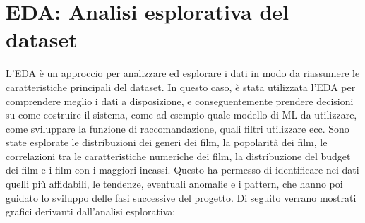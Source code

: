 \documentclass{report}
\begin{document}
    \section{EDA: Analisi esplorativa del dataset}
        L’EDA è un approccio per analizzare ed esplorare i dati in modo da riassumere le caratteristiche principali del dataset.  In questo caso, è stata utilizzata l’EDA per comprendere meglio i dati a disposizione, e conseguentemente prendere decisioni su come costruire il sistema, come ad esempio quale modello di ML da utilizzare, come sviluppare la funzione di raccomandazione, quali filtri utilizzare ecc. Sono state esplorate le distribuzioni dei generi dei film, la popolarità dei film, le correlazioni tra le caratteristiche numeriche dei film, la distribuzione del budget dei film e i film con i maggiori incassi. Questo ha permesso di identificare nei dati quelli più affidabili, le tendenze, eventuali anomalie e i pattern, che hanno poi guidato lo sviluppo delle fasi successive del progetto. Di seguito verrano mostrati grafici derivanti dall'analisi esplorativa:
        \newpage
\end{document}
